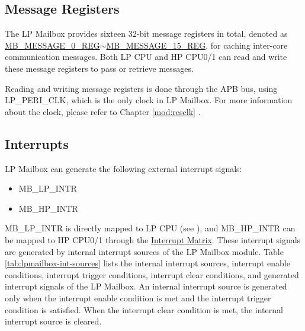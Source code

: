 \documentclass[main\_\_EN.tex]{subfiles}
\begin{document}
\subsection{Message Registers}
The LP Mailbox provides sixteen 32-bit message registers in total, denoted as \hyperref[regdesc:MBMESSAGE0REG]{MB\_MESSAGE\_0\_REG}$\sim$\hyperref[regdesc:MBMESSAGE15REG]{MB\_MESSAGE\_15\_REG}, for caching inter-core communication messages. Both LP CPU and HP CPU0/1 can read and write these message registers to pass or retrieve messages.

Reading and writing message registers is done through the APB bus, using LP\_PERI\_CLK, which is the only clock in LP Mailbox. For more information about the clock, please refer to Chapter \ref{mod:resclk} \textit{}.

\subsection{Interrupts}
\label{sec:lpmailbox-interrupt}


\chipname{} LP Mailbox can generate the following external interrupt signals:
    \begin{itemize}
        \item MB\_LP\_INTR
        \item MB\_HP\_INTR
    \end{itemize}
MB\_LP\_INTR is directly mapped to LP CPU (see \textit{}), and MB\_HP\_INTR can be mapped to HP CPU0/1 through the \hyperref[mod:intmtrx]{Interrupt Matrix}.
These interrupt signals are generated by internal interrupt sources of the LP Mailbox module. Table \ref{tab:lpmailbox-int-sources} lists the internal interrupt sources, interrupt enable conditions, interrupt trigger conditions, interrupt clear conditions, and generated interrupt signals of the LP Mailbox. An internal interrupt source is generated only when the interrupt enable condition is met and the interrupt trigger condition is satisfied. When the interrupt clear condition is met, the internal interrupt source is cleared.
\end{document}
